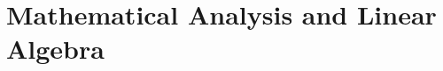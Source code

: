 \documentclass[../../book-en.tex]{subfiles}
\begin{document}
\chapter{Mathematical Analysis and Linear Algebra}
\label{ch:1.1-calculus-linalg-en}















\end{document}
